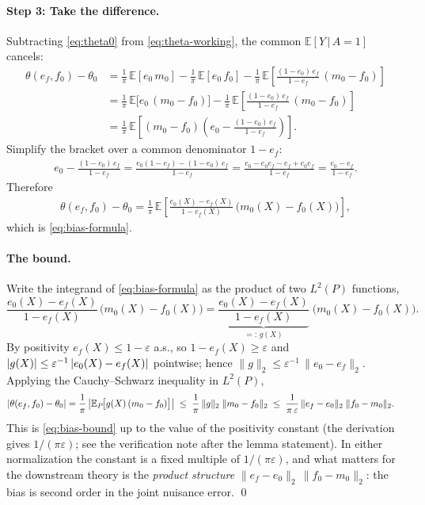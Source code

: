 \documentclass[11pt]{article}
\theoremstyle{plain}
\theoremstyle{remark}
\newcommand{\E}{\mathbb{E}}
\newcommand{\given}{\,\vert\,}
\newcommand{\ef}{e_f}
\newcommand{\ez}{e_0}
\newcommand{\mz}{m_0}
\newcommand{\fz}{f_0}
\newcommand{\Ltwo}[1]{\lVert #1 \rVert_{2}}
\DeclarePairedDelimiter{\abs}{\lvert}{\rvert}
\begin{document}
\paragraph{Step 3: Take the difference.}
Subtracting \eqref{eq:theta0} from \eqref{eq:theta-working}, the common
$\E[Y \given A = 1]$ cancels:
\begin{align*}
  \theta(\ef, \fz) - \theta_0
  &= \frac{1}{\pi}\,\E[\ez\,\mz]
     - \frac{1}{\pi}\,\E[\ez\,\fz]
     - \frac{1}{\pi}\,\E\!\left[\frac{(1 - \ez)\,\ef}{1 - \ef}\,(\mz - \fz)\right] \\
  &= \frac{1}{\pi}\,\E\bigl[\ez\,(\mz - \fz)\bigr]
     - \frac{1}{\pi}\,\E\!\left[\frac{(1 - \ez)\,\ef}{1 - \ef}\,(\mz - \fz)\right] \\
  &= \frac{1}{\pi}\,
     \E\!\left[(\mz - \fz)\left(\ez - \frac{(1 - \ez)\,\ef}{1 - \ef}\right)\right].
\end{align*}
Simplify the bracket over a common denominator $1 - \ef$:
\begin{align*}
  \ez - \frac{(1 - \ez)\,\ef}{1 - \ef}
  = \frac{\ez(1 - \ef) - (1 - \ez)\,\ef}{1 - \ef}
  = \frac{\ez - \ez\ef - \ef + \ez\ef}{1 - \ef}
  = \frac{\ez - \ef}{1 - \ef}.
\end{align*}
Therefore
\begin{align*}
  \theta(\ef, \fz) - \theta_0
  = \frac{1}{\pi}\,
    \E\!\left[\frac{\ez(X) - \ef(X)}{1 - \ef(X)}\,\bigl(\mz(X) - \fz(X)\bigr)\right],
\end{align*}
which is \eqref{eq:bias-formula}.

\paragraph{The bound.}
Write the integrand of \eqref{eq:bias-formula} as the product of two
$L^2(P)$ functions,
\[
  \frac{\ez(X) - \ef(X)}{1 - \ef(X)}\,\bigl(\mz(X) - \fz(X)\bigr)
  = \underbrace{\frac{\ez(X) - \ef(X)}{1 - \ef(X)}}_{=:\,g(X)}\;
    \bigl(\mz(X) - \fz(X)\bigr).
\]
By positivity $\ef(X) \le 1 - \varepsilon$ a.s., so $1 - \ef(X) \ge \varepsilon$ and
$\abs{g(X)} \le \varepsilon^{-1}\,\abs{\ez(X) - \ef(X)}$ pointwise; hence
$\Ltwo{g} \le \varepsilon^{-1}\,\Ltwo{\ez - \ef}$. Applying the Cauchy--Schwarz
inequality in $L^2(P)$,
\begin{align*}
  \abs{\theta(\ef, \fz) - \theta_0}
  &= \frac{1}{\pi}\,\abs*{\E_P\!\bigl[g(X)\,(\mz - \fz)\bigr]}
   \;\le\; \frac{1}{\pi}\,\Ltwo{g}\;\Ltwo{\mz - \fz}
   \;\le\; \frac{1}{\pi\,\varepsilon}\,\Ltwo{\ef - \ez}\;\Ltwo{\fz - \mz}.
\end{align*}
This is \eqref{eq:bias-bound} up to the value of the positivity constant
(the derivation gives $1/(\pi\varepsilon)$; see the verification note after the
lemma statement). In either normalization the constant is a fixed multiple of
$1/(\pi\varepsilon)$, and what matters for the downstream theory is the
\emph{product structure} $\Ltwo{\ef - \ez}\,\Ltwo{\fz - \mz}$: the bias is
second order in the joint nuisance error.
\qed
\end{document}
